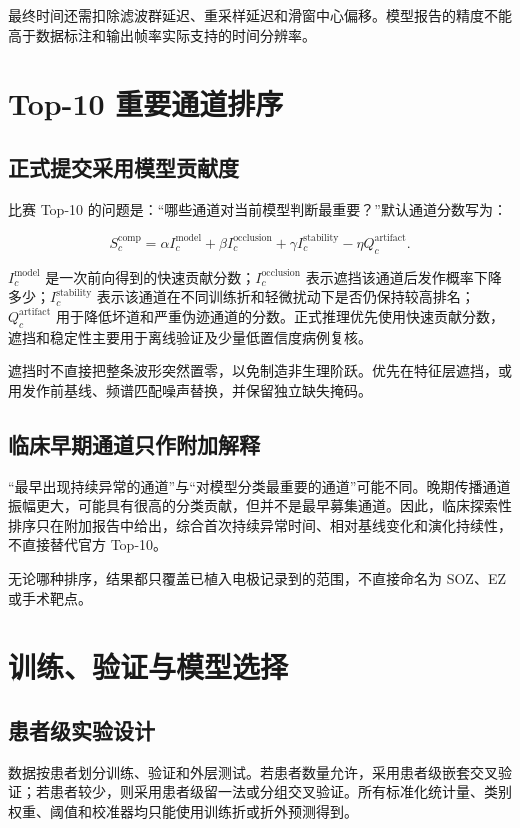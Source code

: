 最终时间还需扣除滤波群延迟、重采样延迟和滑窗中心偏移。模型报告的精度不能高于数据标注和输出帧率实际支持的时间分辨率。

\section{Top-10 重要通道排序}

\subsection{正式提交采用模型贡献度}

比赛 Top-10 的问题是：“哪些通道对当前模型判断最重要？”默认通道分数写为：

\[
S_c^{\mathrm{comp}}=
\alpha I_c^{\mathrm{model}}+
\beta I_c^{\mathrm{occlusion}}+
\gamma I_c^{\mathrm{stability}}-
\eta Q_c^{\mathrm{artifact}}.
\]

$I_c^{\mathrm{model}}$ 是一次前向得到的快速贡献分数；$I_c^{\mathrm{occlusion}}$ 表示遮挡该通道后发作概率下降多少；$I_c^{\mathrm{stability}}$ 表示该通道在不同训练折和轻微扰动下是否仍保持较高排名；$Q_c^{\mathrm{artifact}}$ 用于降低坏道和严重伪迹通道的分数。正式推理优先使用快速贡献分数，遮挡和稳定性主要用于离线验证及少量低置信度病例复核。

遮挡时不直接把整条波形突然置零，以免制造非生理阶跃。优先在特征层遮挡，或用发作前基线、频谱匹配噪声替换，并保留独立缺失掩码。

\subsection{临床早期通道只作附加解释}

“最早出现持续异常的通道”与“对模型分类最重要的通道”可能不同。晚期传播通道振幅更大，可能具有很高的分类贡献，但并不是最早募集通道。因此，临床探索性排序只在附加报告中给出，综合首次持续异常时间、相对基线变化和演化持续性，不直接替代官方 Top-10。

无论哪种排序，结果都只覆盖已植入电极记录到的范围，不直接命名为 SOZ、EZ 或手术靶点。

\section{训练、验证与模型选择}

\subsection{患者级实验设计}

数据按患者划分训练、验证和外层测试。若患者数量允许，采用患者级嵌套交叉验证；若患者较少，则采用患者级留一法或分组交叉验证。所有标准化统计量、类别权重、阈值和校准器均只能使用训练折或折外预测得到。

